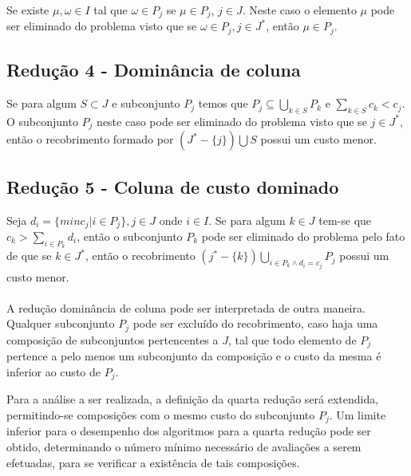 \documentclass[a4paper,10pt]{article}
\begin{document}
Se existe $\mu , \omega \in I$ tal que $\omega \in P_{j}$ se $\mu \in P_{j}$, $j \in J$. Neste caso o elemento $\mu$ pode ser eliminado do problema visto que se $\omega \in P_{j}, j \in J^{*}$, então $\mu \in P_{j}$. 

\subsection{Redução 4 - Dominância de coluna}

Se para algum $S \subset J$ e subconjunto $P_{j}$ temos que $P_{j} \subseteq \bigcup _{k \in S} P_{k}$ e $ \sum _{k \in S} c_{k} < c_{j}$. O subconjunto $P_{j}$ neste caso pode ser eliminado do problema visto que se $j \in J^{*}$, então o recobrimento formado por $(J^{*} - \{ j\}) \bigcup S$ possui um custo menor.

\subsection{Redução 5 - Coluna de custo dominado}

Seja $d_{i} = \{ min  c_{j} | i \in P_{j} \}, j \in J$ onde $i \in I$. Se para algum $k \in J$ tem-se que $c_{k} > \sum _{i \in P_{k} } d_{i} $, então o subconjunto $ P_{k}$ pode ser eliminado do problema pelo fato de que se $k \in J^{*}$, então o recobrimento $(j^{*} - \{k \}) \bigcup _{i \in P _{k} \wedge  d_{i} = c_{j} } P_{j} $ possui um custo menor.

\paragraph{}
A redução dominância de coluna pode ser interpretada de outra maneira. Qualquer subconjunto $P_{j}$ pode ser excluído do recobrimento, caso haja uma composição de subconjuntos pertencentes a $J$, tal que todo elemento de $P_{j}$ pertence a pelo menos um subconjunto da composição e o custo da mesma é inferior ao custo de $P_{j}$.

Para a análise a ser realizada, a definição da quarta redução será extendida, permitindo-se composições com o mesmo custo do subconjunto $P_{j}$. Um limite inferior para o desempenho dos algoritmos para a quarta redução pode ser obtido, determinando o número mínimo necessário de avaliações a serem efetuadas, para se verificar a existência de tais composições.
\end{document}
